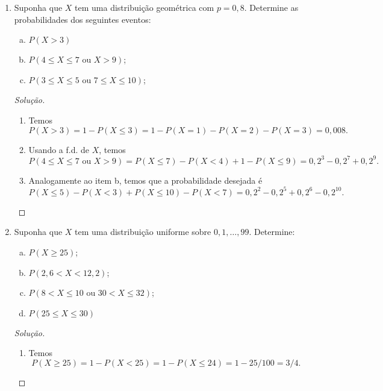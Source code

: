 \documentclass[../Notas.tex]{subfiles}
\begin{document}
\begin{enumerate}
\begin{proof}[Solução]
\[        \]
    \end{proof}
    \item Suponha que $X$ tem uma distribuição geométrica com $p = 0,8$. Determine as probabilidades dos seguintes eventos:
    \begin{enumerate}[a)]
    \item $P(X > 3)$
    \item $P(4 \leq X \leq 7 \text{ ou } X > 9)$;
    \item $P(3 \leq X \leq 5 \text{ ou } 7 \leq X \leq 10)$;
    \end{enumerate}
    \begin{proof}[Solução]
        \begin{enumerate}
            \item Temos
            \[
            P(X>3) = 1 - P(X\leq 3)
                   = 1 - P(X=1) - P(X=2) - P(X=3)
                   = 0,008.
            \]
            \item Usando a f.d. de $X$, temos
            \[
            P(4\leq X\leq 7 \text{ ou } X>9) = P(X\leq 7) - P(X < 4) + 1 - P(X\leq 9)
                                             = 0,2^3 - 0,2^7 + 0,2^9.
            \]
            \item Analogamente ao item b, temos que a probabilidade desejada é
            \[
            P(X\leq 5) - P(X < 3) + P(X\leq 10) - P(X < 7)
            = 0,2^2 - 0,2^5 + 0,2^6 - 0,2^{10}.
            \]
        \end{enumerate}
    \end{proof}
    \item Suponha que $X$ tem uma distribuição uniforme sobre $0, 1, \dots , 99$. Determine:
    \begin{enumerate}[a)]
    \item $P(X \geq 25)$;
    \item $P(2,6 < X < 12,2)$;
    \item $P(8 < X \leq 10 \text{ ou } 30 < X \leq 32)$;
    \item $P(25 \leq X \leq 30)$
    \end{enumerate}
    \begin{proof}[Solução]
        \begin{enumerate}
            \item Temos
            \[
            P(X\geq 25) = 1 - P(X<25) = 1 - P(X\leq 24) = 1 - 25/100 = 3/4.
            \]

\end{enumerate}
\end{proof}
\end{enumerate}
\end{document}
